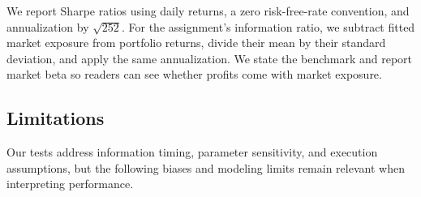 We report Sharpe ratios using daily returns, a zero risk-free-rate
convention, and annualization by \(\sqrt{252}\). For the assignment's
information ratio, we subtract fitted market exposure from portfolio
returns, divide their mean by their standard deviation, and apply the
same annualization. We state the benchmark and report market beta so
readers can see whether profits come with market exposure.

\subsection{Limitations}

Our tests address information timing, parameter sensitivity, and execution
assumptions, but the following biases and modeling limits remain relevant
when interpreting performance.

